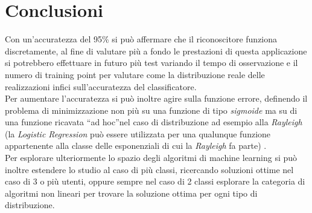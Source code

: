 \chapter{Conclusioni}
Con un'accuratezza del 95\% si pu\`{o} affermare che il riconoscitore funziona discretamente, al fine di valutare pi\`{u} a fondo le prestazioni di questa applicazione si potrebbero effettuare in futuro pi\`{u} test variando il tempo di osservazione e il numero di training point per valutare come la distribuzione reale delle realizzazioni infici sull'accuratezza del classificatore.\\

Per aumentare l'accuratezza si pu\`{o} inoltre agire sulla funzione errore, definendo il problema di minimizzazione non pi\`{u} su una funzione di tipo \emph{sigmoide} ma su di una funzione ricavata \textquotedblleft ad hoc\textquotedblright nel caso di distribuzione ad esempio alla \emph{Rayleigh} (la \emph{Logistic Regression} pu\`{o} essere utilizzata per una qualunque funzione appartenente alla classe delle esponenziali di cui la \emph{Rayleigh} fa parte) \cite{Article1}.\\

Per esplorare ulteriormente lo spazio degli algoritmi di machine learning si pu\`{o} inoltre estendere lo studio al caso di pi\`{u} classi, ricercando soluzioni ottime nel caso di 3 o pi\`{u} utenti, oppure sempre nel caso di 2 classi esplorare la categoria di algoritmi non lineari per trovare la soluzione ottima per ogni tipo di distribuzione.